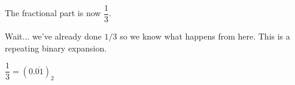 \documentclass[12pt,letterpaper,noanswers]{exam}
\begin{document}
The fractional part is now $\dfrac{1}{3}$. 

Wait... we've already done $1/3$ so we know what happens from here.  This is a repeating binary expansion.  

$\dfrac{1}{3} = (0.\overline{01})_2$



    
    


\end{document}
